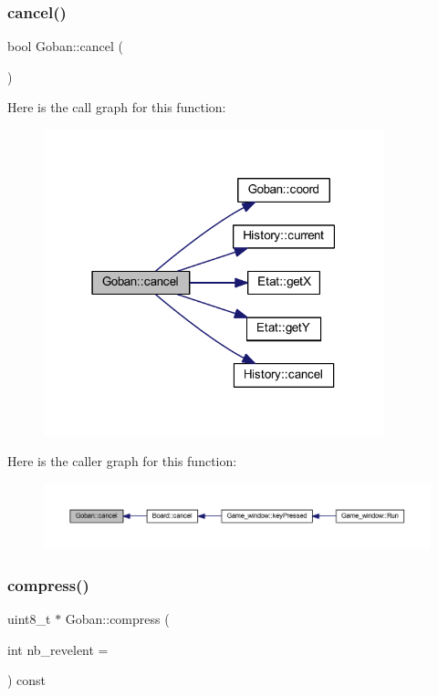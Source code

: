 \subsubsection{\texorpdfstring{cancel()}{cancel()}}
{\footnotesize\ttfamily bool Goban\+::cancel (\begin{DoxyParamCaption}{ }\end{DoxyParamCaption})}

Here is the call graph for this function\+:
\nopagebreak
\begin{figure}[H]
\begin{center}
\leavevmode
\includegraphics[width=279pt]{class_goban_ae7ee3b39f3c0d28c9bca286ca538f8ac_cgraph}
\end{center}
\end{figure}
Here is the caller graph for this function\+:
\nopagebreak
\begin{figure}[H]
\begin{center}
\leavevmode
\includegraphics[width=350pt]{class_goban_ae7ee3b39f3c0d28c9bca286ca538f8ac_icgraph}
\end{center}
\end{figure}
\mbox{\label{class_goban_a8ad67a618a510bb378d00281228b1b13}} 
\subsubsection{\texorpdfstring{compress()}{compress()}}
{\footnotesize\ttfamily uint8\+\_\+t $\ast$ Goban\+::compress (\begin{DoxyParamCaption}\item[{int}]{nb\+\_\+revelent = {} }\end{DoxyParamCaption}) const}

